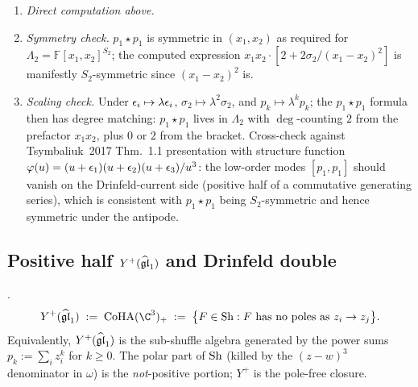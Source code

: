 \begin{verification}
\label{opus:verif:p1-star-p1}
\mbox{}
\begin{enumerate}
\item \emph{Direct computation above.}
\item \emph{Symmetry check.} $p_1 \star p_1$ is symmetric in $(x_1, x_2)$ as required
for $\Lambda_2 = \mathbb{F}[x_1, x_2]^{S_2}$; the computed expression
$x_1 x_2 \cdot [2 + 2\sigma_2/(x_1 - x_2)^2]$ is manifestly $S_2$-symmetric since
$(x_1 - x_2)^2$ is.
\item \emph{Scaling check.} Under $\epsilon_i \mapsto \lambda \epsilon_i$,
$\sigma_2 \mapsto \lambda^2 \sigma_2$, and $p_k \mapsto \lambda^k p_k$; the
$p_1 \star p_1$ formula then has degree matching: $p_1 \star p_1$ lives in
$\Lambda_2$ with $\deg$-counting $2$ from the prefactor $x_1 x_2$, plus $0$ or
$2$ from the bracket. Cross-check against Tsymbaliuk~2017 Thm.~1.1 presentation
with structure function $\varphi(u) = (u + \epsilon_1)(u + \epsilon_2)(u + \epsilon_3)/u^3$:
the low-order modes $[p_1, p_1]$ should vanish on the Drinfeld-current side
(positive half of a commutative generating series), which is consistent with
$p_1 \star p_1$ being $S_2$-symmetric and hence symmetric under the antipode.
\end{enumerate}
\end{verification}

\subsection{Positive half $Y^+(\widehat{\mathfrak{gl}}_1)$ and Drinfeld double}
\label{opus:sec:positive-half-drinfeld-double}

\begin{definition}
\label{opus:def:positive-half}
\ClaimStatusDefinition.
\[
 Y^+(\gghone) \;:=\; \CoHA(\C^3)_+ \;:=\;
 \bigl\{F \in \Sh : F \text{ has no poles as } z_i \to z_j\bigr\}.
\]
Equivalently, $Y^+(\widehat{\mathfrak{gl}}_1)$ is the sub-shuffle algebra generated by the power sums
$p_k := \sum_i z_i^k$ for $k \geq 0$. The polar part of $\mathrm{Sh}$ (killed by the $(z-w)^3$
denominator in $\omega$) is the \emph{not}-positive portion; $Y^+$ is the pole-free
closure.
\end{definition}

